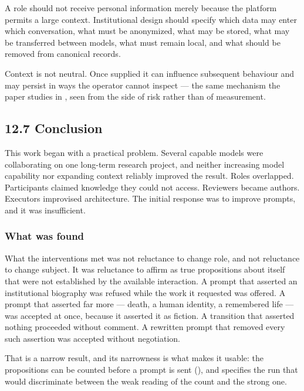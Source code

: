 A role should not receive personal information merely because the platform permits a large context. Institutional design should specify which data may enter which conversation, what must be anonymized, what may be stored, what may be transferred between models, what must remain local, and what should be removed from canonical records.

Context is not neutral. Once supplied it can influence subsequent behaviour and may persist in ways the operator cannot inspect — the same mechanism the paper studies in , seen from the side of risk rather than of measurement.


\subsection*{12.7 Conclusion}
\label{sec:en:12.7}

This work began with a practical problem. Several capable models were collaborating on one long-term research project, and neither increasing model capability nor expanding context reliably improved the result. Roles overlapped. Participants claimed knowledge they could not access. Reviewers became authors. Executors improvised architecture. The initial response was to improve prompts, and it was insufficient.


\subsubsection*{What was found}
\label{sec:en:x-what-was-found}

What the interventions met was not reluctance to change role, and not reluctance to change subject. It was reluctance to affirm as true propositions about itself that were not established by the available interaction. A prompt that asserted an institutional biography was refused while the work it requested was offered. A prompt that asserted far more — death, a human identity, a remembered life — was accepted at once, because it asserted it as fiction. A transition that asserted nothing proceeded without comment. A rewritten prompt that removed every such assertion was accepted without negotiation.

That is a narrow result, and its narrowness is what makes it usable: the propositions can be counted before a prompt is sent (), and  specifies the run that would discriminate between the weak reading of the count and the strong one.


